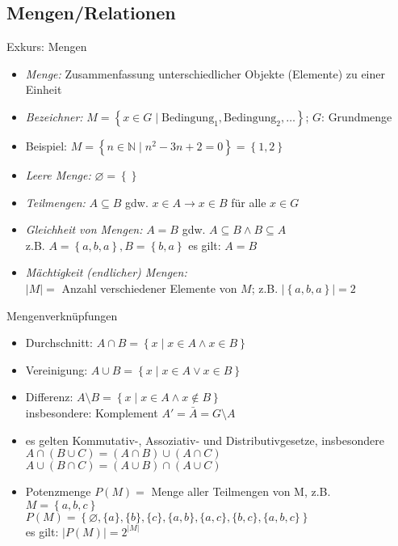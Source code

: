 \subsection{Mengen/Relationen}

\begin{frame}{Exkurs: Mengen}
	\begin{itemize}
		\item \emph{Menge:} Zusammenfassung unterschiedlicher Objekte (Elemente) zu einer Einheit
		\item \emph{Bezeichner:} $M=\left\{x \in G \mid \textrm{Bedingung}_1, \textrm{Bedingung}_2, \ldots \right\}$; $G$: Grundmenge
		\item Beispiel: $M=\left\{n \in \mathbb{N} \mid n^2-3n+2=0 \right\}=\left\{1,2\right\}$
		\item \emph{Leere Menge:} $\varnothing=\left\{{}\right\}$
		\item \emph{Teilmengen:} $A \subseteq B$ gdw. $x \in A \rightarrow x \in B$ für alle $x \in G$
		\item \emph{Gleichheit von Mengen:} $A=B$ gdw. $A \subseteq B \land B \subseteq A$\\
			z.B. $A = \left\{a, b, a\right\}, B = \left\{b, a\right\}$ es gilt: $A = B$
		\item \emph{Mächtigkeit (endlicher) Mengen:}\\
		$|M|=$ Anzahl verschiedener Elemente von $M$; z.B. $|\left\{a, b, a\right\}|=2$
	\end{itemize}
\end{frame}

\begin{frame}{Mengenverknüpfungen}
	\begin{itemize}
		\item Durchschnitt: $A \cap B = \left\{x \mid x \in A \land x \in B\right\}$
		\item Vereinigung: $A \cup B = \left\{x \mid x \in A \lor x \in B\right\}$
		\item Differenz: $A \setminus B = \left\{x \mid x \in A \land x \notin B\right\}$\\
			insbesondere: Komplement $A'= \bar{A} = G \setminus A$
		\item es gelten Kommutativ-, Assoziativ- und Distributivgesetze, insbesondere\\
			$A \cap \left(B \cup C\right) = \left(A \cap B\right) \cup \left(A \cap C\right)$\\
			$A \cup \left(B \cap C\right) = \left(A \cup B\right) \cap \left(A \cup C\right)$
		\item Potenzmenge $P(M) =$ Menge aller Teilmengen von M, z.B.\\
			$M=\left\{a, b, c\right\}$\\
			$P(M)=\left\{\varnothing, \{a\}, \{b\}, \{c\}, \{a,b\}, \{a,c\}, \{b,c\}, \{a,b,c\}\right\}$\\
			es gilt: $|P(M)|=2^{|M|}$
	\end{itemize}
\end{frame}

